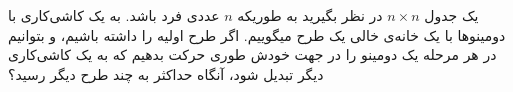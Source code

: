 یک جدول $n \times n$ در نظر بگیرید به طوریکه $n$ عددی فرد باشد. 
به یک کاشی‌کاری با دومینوها با یک خانه‌ی خالی یک طرح میگوییم. اگر طرح اولیه را داشته باشیم، و بتوانیم در هر مرحله یک دومینو را در جهت خودش طوری حرکت بدهیم که به یک کاشی‌کاری دیگر تبدیل شود، آنگاه حداکثر به چند طرح دیگر رسید؟